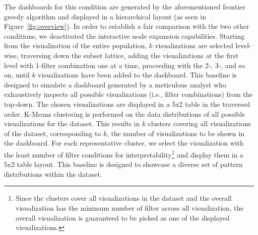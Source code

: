\stitle{\system:} The dashboards for this condition are generated by the aforementioned frontier greedy algorithm and displayed in a hierarchical layout (as seen in Figure~\ref{fig:overview}).  In order to establish a fair comparison with the two other conditions, we deactivated  the interactive node expansion capabilities.
 Starting from the visualization of the entire population, $k$ visualizations are selected level-wise, traversing down the subset lattice, adding the visualizations at the first level with 1-filter combination one at a time, proceeding with the 2-, 3-, and so on, until $k$ visualizations have been added to the dashboard. This baseline is designed to simulate a dashboard generated by a meticulous analyst who exhaustively inspects all possible visualizations (i.e., filter combinations) from the top-down. The chosen visualizations are displayed in a 5x2 table in the traversed order.
\stitle{\cluster:} K-Means clustering is performed on the data distributions of all possible visualizations for the dataset. This results in $k$ clusters covering all visualizations of the dataset, corresponding to $k$, the number of visualizations to be shown in the dashboard. For each representative cluster, we select the visualization with the least number of filter conditions for interpretability\footnote{Since the clusters cover all visualizations in the dataset and the overall visualization has the minimum number of filter across all visualization, the overall visualization is guaranteed to be picked as one of the displayed visualizations.} and display them in a 5x2 table layout. This baseline is designed to showcase a diverse set of pattern distributions within the dataset.
